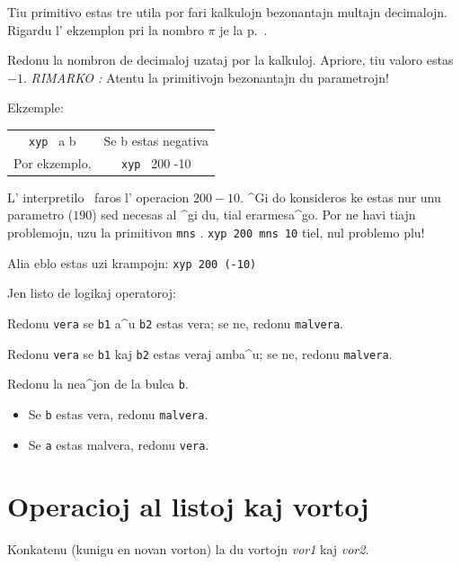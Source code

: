 Tiu primitivo estas tre utila por fari kalkulojn bezonantajn multajn decimalojn.
Rigardu l' ekzemplon pri la nombro $\pi$ je la p.~\pageref{approx-pi}.


Redonu la nombron de decimaloj uzataj por la kalkuloj.  Apriore, tiu valoro estas $-1$.
\vspace{0.5cm}
\noindent \textit{RIMARKO :}  Atentu la primitivojn bezonantajn du parametrojn!

Ekzemple:
\begin{tabular}{cc}
 \texttt{xyp} \ a b &
 Se b estas negativa\\
 Por ekzemplo, &
 \texttt{xyp} \ 200 -10\\
\end{tabular}

L' interpretilo \logo\ faros l' operacion $200-10$.  ^Gi do konsideros
ke estas nur unu parametro ($190$) sed necesas al ^gi du, tial
erarmesa^go.  Por ne havi tiajn problemojn, uzu la primitivon \og
\texttt{mns} \fg{}.  \texttt{xyp 200 mns 10} tiel, nul problemo plu!

Alia eblo estas uzi krampojn: \texttt{xyp 200 (-10)}

\vspace{0.5cm}

Jen listo de logikaj operatoroj:


Redonu \texttt{vera} se \texttt{b1} a^u \texttt{b2} estas vera; se ne, redonu \texttt{malvera}.


Redonu \texttt{vera} se \texttt{b1} kaj \texttt{b2} estas veraj amba^u; se ne, redonu \texttt{malvera}.


Redonu la nea^jon de la bulea \texttt{b}.

\begin{itemize}
 \item Se \texttt{b} estas vera, redonu \texttt{malvera}.
 \item Se \texttt{a} estas malvera, redonu \texttt{vera}.
\end{itemize}

\section{Operacioj al listoj kaj vortoj}
\noindent 
{}

Konkatenu (kunigu en novan vorton) la du vortojn \textit{vor1} kaj \textit{vor2}.

